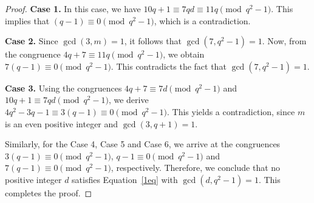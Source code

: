 \documentclass[10pt,a4paper]{amsart}
\begin{document}
\begin{proof}
\textbf{Case 1.} In this case, we have $10q+1\equiv 7qd\equiv 11q\pmod{q^2-1}$. This implies that $(q-1) \equiv 0 \pmod{q^2-1}$, which is a contradiction.

\textbf{Case 2.} Since $\gcd(3,m)=1$, it follows that $\gcd(7,q^2-1)=1$. Now, from the congruence $4q+7\equiv 11q\pmod{q^2-1}$, we obtain $ 7(q-1)\equiv0\pmod{q^2-1}. $ This contradicts the fact that $\gcd(7,q^2-1)=1$.

\textbf{Case 3.} Using the congruences $4q+7\equiv7d\pmod{q^2-1}$ and $10q+1\equiv7qd\pmod{q^2-1}$, we derive $4q^2-3q-1\equiv3(q-1)\equiv0\pmod{q^2-1}.$
This yields a contradiction, since $m$ is an even positive integer and $\gcd(3, q+1)  = 1$.  

Similarly, for the Case 4, Case 5 and Case 6, we arrive at the congruences $3(q-1)\equiv 0 \pmod{q^2-1}$, $q-1\equiv 0 \pmod{q^2-1}$ and $7(q-1)\equiv 0 \pmod{q^2-1}$, respectively. Therefore, we conclude that no positive integer $d$ satisfies Equation~\eqref{1eq} with $\gcd(d,q^2-1)=1$. This completes the proof.
\end{proof}
\end{document}
